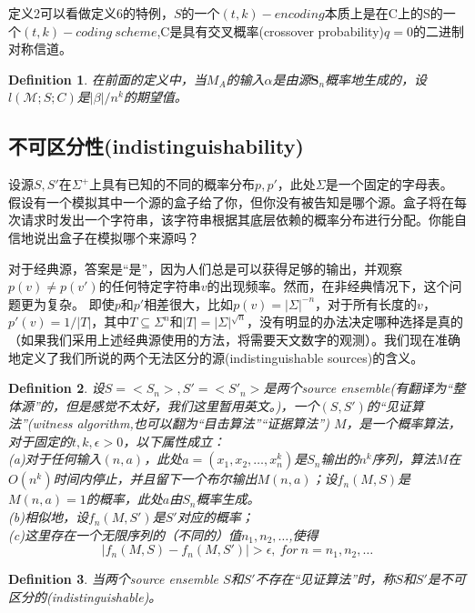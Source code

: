 \documentclass[]{article}
\newtheorem{definition}{Definition}
\begin{document}
定义2可以看做定义6的特例，$S$的一个$(t,k)-encoding$本质上是在C上的S的一个$(t,k)-coding\ scheme$,C是具有交叉概率(crossover probability)$q=0$的二进制对称信道。


\begin{definition}
	在前面的定义中，当$M_A$的输入$\alpha$是由源$\textbf{S}_n$概率地生成的，设$l(\mathcal{M};S;C)$是$|\beta|/n^k$的期望值。
\end{definition}

\subsection{不可区分性(indistinguishability)}

设源$S,S'$在$\Sigma^+$上具有已知的不同的概率分布$p,p'$，此处$\Sigma$是一个固定的字母表。
假设有一个模拟其中一个源的盒子给了你，但你没有被告知是哪个源。盒子将在每次请求时发出一个字符串，该字符串根据其底层依赖的概率分布进行分配。你能自信地说出盒子在模拟哪个来源吗？


对于经典源，答案是“是”，因为人们总是可以获得足够的输出，并观察$p(v)\neq p(v')$的任何特定字符串$v$的出现频率。然而，在非经典情况下，这个问题更为复杂。
即使$p$和$p'$相差很大，比如$p(v)=|\Sigma|^{-n}$，对于所有长度的$v$，$p'(v)=1/|T|$，其中$T\subseteq \Sigma^n$和$|T|=|\Sigma|^{\sqrt{n}}$，没有明显的办法决定哪种选择是真的（如果我们采用上述经典源使用的方法，将需要天文数字的观测）。我们现在准确地定义了我们所说的两个无法区分的源(indistinguishable sources)的含义。


\begin{definition}
	设$S=<S_n>,S'=<S'_n>$是两个source ensemble(有翻译为“整体源”的，但是感觉不太好，我们这里暂用英文。)，一个$(S,S')$的“见证算法”(witness algorithm,也可以翻为“目击算法”“证据算法”) $M$，是一个概率算法，对于固定的$t,k,\epsilon >0$，以下属性成立：\\
	(a)对于任何输入$(n,a)$，此处$a=(x_1,x_2,\ldots,x_n^k)$是$S_n$输出的$n^k$序列，算法$M$在$O(n^k)$时间内停止，并且留下一个布尔输出$M(n,a)$；设$f_n(M,S)$是$M(n,a)=1$的概率，此处$a$由$S_n$概率生成。\\
	(b)相似地，设$f_n(M,S')$是$S'$对应的概率；\\
	(c)这里存在一个无限序列的（不同的）值$n_1,n_2,\ldots$,使得
	\[|f_n(M,S)-f_n(M,S')|>\epsilon,\ for\ n=n_1,n_2,\ldots\]
\end{definition}

\begin{definition}
	当两个source ensemble $S$和$S'$不存在“见证算法”时，称$S$和$S'$是不可区分的(indistinguishable)。
\end{definition}
\end{document}
